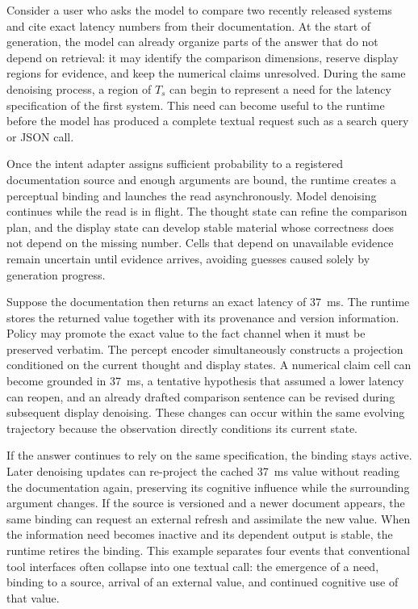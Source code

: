 Consider a user who asks the model to compare two recently released systems and cite exact latency numbers from their documentation. At the start of generation, the model can already organize parts of the answer that do not depend on retrieval: it may identify the comparison dimensions, reserve display regions for evidence, and keep the numerical claims unresolved. During the same denoising process, a region of $T_s$ can begin to represent a need for the latency specification of the first system. This need can become useful to the runtime before the model has produced a complete textual request such as a search query or JSON call.

Once the intent adapter assigns sufficient probability to a registered documentation source and enough arguments are bound, the runtime creates a perceptual binding and launches the read asynchronously. Model denoising continues while the read is in flight. The thought state can refine the comparison plan, and the display state can develop stable material whose correctness does not depend on the missing number. Cells that depend on unavailable evidence remain uncertain until evidence arrives, avoiding guesses caused solely by generation progress.

Suppose the documentation then returns an exact latency of 37~ms. The runtime stores the returned value together with its provenance and version information. Policy may promote the exact value to the fact channel when it must be preserved verbatim. The percept encoder simultaneously constructs a projection conditioned on the current thought and display states. A numerical claim cell can become grounded in 37~ms, a tentative hypothesis that assumed a lower latency can reopen, and an already drafted comparison sentence can be revised during subsequent display denoising. These changes can occur within the same evolving trajectory because the observation directly conditions its current state.

If the answer continues to rely on the same specification, the binding stays active. Later denoising updates can re-project the cached 37~ms value without reading the documentation again, preserving its cognitive influence while the surrounding argument changes. If the source is versioned and a newer document appears, the same binding can request an external refresh and assimilate the new value. When the information need becomes inactive and its dependent output is stable, the runtime retires the binding. This example separates four events that conventional tool interfaces often collapse into one textual call: the emergence of a need, binding to a source, arrival of an external value, and continued cognitive use of that value.

